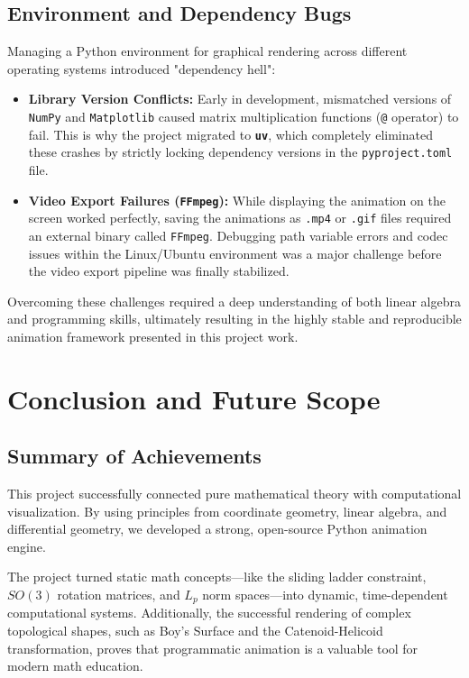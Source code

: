 \documentclass[12pt, a4paper]{report}
\begin{document}
\section{Environment and Dependency Bugs}
Managing a Python environment for graphical rendering across different operating systems introduced "dependency hell":

\begin{itemize}
    \item \textbf{Library Version Conflicts:} Early in development, mismatched versions of \texttt{NumPy} and \texttt{Matplotlib} caused matrix multiplication functions (\texttt{@} operator) to fail. This is why the project migrated to \textbf{\texttt{uv}}, which completely eliminated these crashes by strictly locking dependency versions in the \texttt{pyproject.toml} file.\cite{uv_docs}
    \item \textbf{Video Export Failures (\texttt{FFmpeg}):} While displaying the animation on the screen worked perfectly, saving the animations as \texttt{.mp4} or \texttt{.gif} files required an external binary called \texttt{FFmpeg}. Debugging path variable errors and codec issues within the Linux/Ubuntu environment was a major challenge before the video export pipeline was finally stabilized.\cite{matplotlib_docs}
\end{itemize}

\vspace{0.6cm}
Overcoming these challenges required a deep understanding of both linear algebra and programming skills, ultimately resulting in the highly stable and reproducible animation framework presented in this project work.

\chapter{Conclusion and Future Scope}

\section{Summary of Achievements}
This project successfully connected pure mathematical theory with computational visualization. By using principles from coordinate geometry, linear algebra, and differential geometry, we developed a strong, open-source Python animation engine. 

The project turned static math concepts—like the sliding ladder constraint, $SO(3)$ rotation matrices, and $L_p$ norm spaces—into dynamic, time-dependent computational systems. Additionally, the successful rendering of complex topological shapes, such as Boy’s Surface and the Catenoid-Helicoid transformation, proves that programmatic animation is a valuable tool for modern math education.
\end{document}
